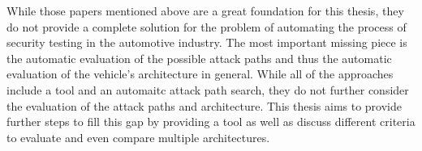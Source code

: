 While those papers mentioned above are a great foundation for this thesis, they do not provide a complete solution for the problem of automating the process of security testing in the automotive industry.
The most important missing piece is the automatic evaluation of the possible attack paths and thus the automatic evaluation of the vehicle's architecture in general.
While all of the approaches include a tool and an automaitc attack path search, they do not further consider the evaluation of the attack paths and architecture.
This thesis aims to provide further steps to fill this gap by providing a tool as well as discuss different criteria to evaluate and even compare multiple architectures.
